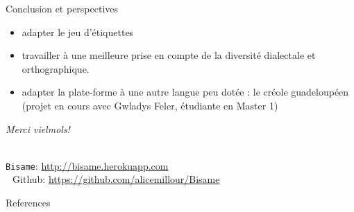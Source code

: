 \documentclass[french]{beamer}
\newcommand{\themename}{\textbf{\textsc{metropolis}}\xspace}
\newcommand{\tool}[1]{\texttt{#1}\xspace}
\begin{document}
\begin{frame}{Conclusion et perspectives}
    \begin{itemize}
    \item adapter le jeu d'étiquettes
    \item<2-> travailler à une meilleure prise en compte de la diversité dialectale et orthographique.
    \item<3-> adapter la plate-forme à une autre langue peu dotée : le créole guadeloupéen (\small projet en cours avec Gwladys Feler, étudiante en Master 1)
    \end{itemize}
\end{frame}

\begin{frame}[standout]
  \textit{Merci vielmols!} \\~\\
  \begin{center}
    \normalsize
    \tool{Bisame}: \url{http://bisame.herokuapp.com} \\ 
    
    \includegraphics[width=0.02\textwidth]{figures/github-white.png}\enspace Github:         \url{https://github.com/alicemillour/Bisame}
  \end{center}
\end{frame}


%
%

\begin{frame}[allowframebreaks]{References}

  
  
\end{frame}
\end{document}
